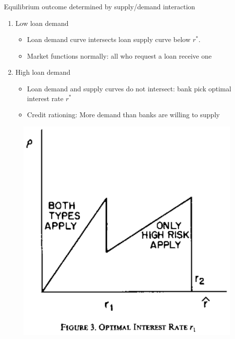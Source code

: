 \documentclass{beamer}
\begin{document}
\begin{frame}
 Equilibrium outcome determined by supply/demand interaction
\begin{enumerate}
  \item Low loan demand
  \begin{itemize}
    \item Loan demand curve intersects loan supply curve below $r^*$. 
    \item Market functions normally: all who request a loan receive one
\end{itemize}
\medskip
  \item High loan demand
  \begin{itemize}
    \item Loan demand and supply curves do not intersect: bank pick optimal interest rate $r^*$    
    \item Credit rationing: More demand than banks are willing to supply
  \end{itemize}
\end{enumerate}
\end{frame}


\begin{frame}
  \begin{figure}
    \includegraphics{stiglitz_weiss3.eps}
  \end{figure}
\end{frame}
\end{document}
